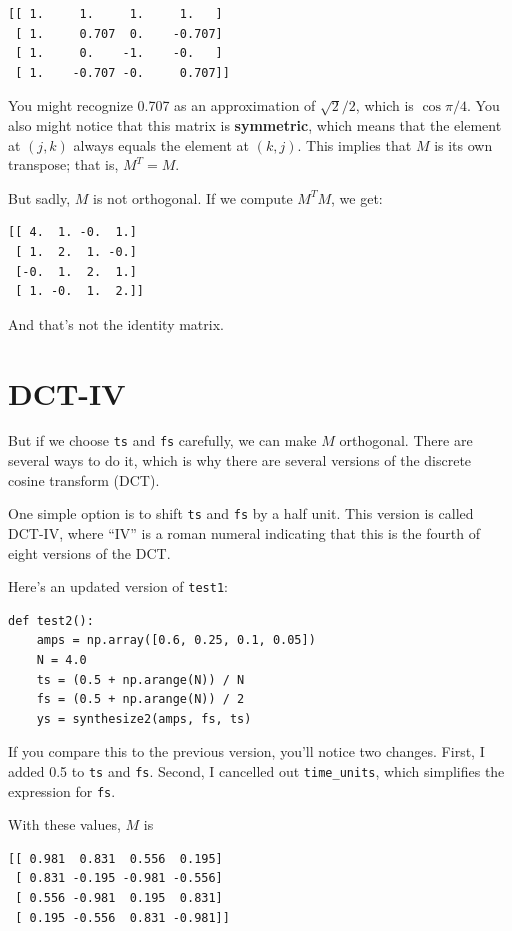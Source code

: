 \documentclass[12pt]{book}
\begin{document}
\begin{verbatim}
[[ 1.     1.     1.     1.   ]
 [ 1.     0.707  0.    -0.707]
 [ 1.     0.    -1.    -0.   ]
 [ 1.    -0.707 -0.     0.707]]
\end{verbatim}

You might recognize 0.707 as an approximation of $\sqrt{2}/2$,
which is $\cos \pi/4$.  You also might notice that this matrix
is {\bf symmetric}, which means that the element at $(j, k)$ always
equals the element at $(k, j)$.  This implies that $M$ is its own
transpose; that is, $M^T = M$.

But sadly, $M$ is not orthogonal.  If we compute $M^TM$, we get:

\begin{verbatim}
[[ 4.  1. -0.  1.]
 [ 1.  2.  1. -0.]
 [-0.  1.  2.  1.]
 [ 1. -0.  1.  2.]]
\end{verbatim}

And that's not the identity matrix.


\section{DCT-IV}
\label{dctiv}

But if we choose {\tt ts} and {\tt fs} carefully,
we can make $M$ orthogonal.  There are several ways to do it, which
is why there are several versions of the discrete cosine transform (DCT).

One simple option is to shift {\tt ts} and {\tt fs} by a half unit.
This version is called DCT-IV, where ``IV'' is a roman numeral
indicating that this is the fourth of eight versions of the DCT.

Here's an updated version of {\tt test1}:

\begin{verbatim}
def test2():
    amps = np.array([0.6, 0.25, 0.1, 0.05])
    N = 4.0
    ts = (0.5 + np.arange(N)) / N
    fs = (0.5 + np.arange(N)) / 2
    ys = synthesize2(amps, fs, ts)
\end{verbatim}

If you compare this to the previous version, you'll notice
two changes.  First, I added 0.5 to {\tt ts} and {\tt fs}.
Second, I cancelled out \verb"time_units", which simplifies
the expression for {\tt fs}.

With these values, $M$ is

\begin{verbatim}
[[ 0.981  0.831  0.556  0.195]
 [ 0.831 -0.195 -0.981 -0.556]
 [ 0.556 -0.981  0.195  0.831]
 [ 0.195 -0.556  0.831 -0.981]]
\end{verbatim}
\end{document}
